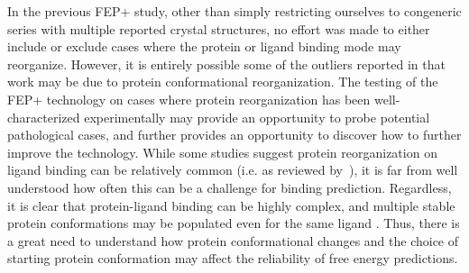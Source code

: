 In the previous FEP+ study\cite{FEPplus}, other than simply restricting ourselves to congeneric series with multiple reported crystal structures, no effort was made to either include or exclude cases where the protein or ligand binding mode may reorganize.
However, it is entirely possible some of the outliers reported in that work may be due to protein conformational reorganization.
The testing of the FEP+ technology on cases where protein reorganization has been well-characterized experimentally may provide an opportunity to probe potential pathological cases, and further provides an opportunity to discover how to further improve the technology. While some studies suggest protein reorganization on ligand binding can be relatively common (i.e. as reviewed by~\cite{Mobley:2009bm}), it is far from well understood how often this can be a challenge for binding prediction.
Regardless, it is clear that protein-ligand binding can be highly complex, and multiple stable protein conformations may be populated even for the same ligand \cite{doi:10.1021/jm060167o,Gutteridge200521,Merski2015}.
Thus, there is a great need to understand how protein conformational changes and the choice of starting protein conformation may affect the reliability of free energy predictions.

